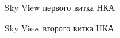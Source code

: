 \documentclass[]{article}
\begin{document}
 \begin{figure}[h!]
 	
 	\caption{Sky View первого витка НКА }
 	\label{skyv_1}
 \end{figure}
 \begin{figure}[h!]
	
	\caption{Sky View второго витка НКА }
	\label{skyv_2}
\end{figure}
\end{document}

